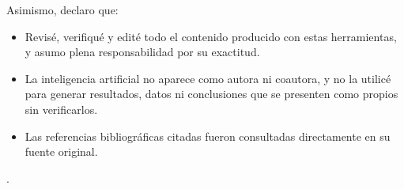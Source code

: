 Asimismo, declaro que:
\begin{itemize}
  \item Revisé, verifiqué y edité todo el contenido producido con estas
        herramientas, y asumo plena responsabilidad por su exactitud.
  \item La inteligencia artificial no aparece como autora ni coautora, y no
        la utilicé para generar resultados, datos ni conclusiones que se
        presenten como propios sin verificarlos.
  \item Las referencias bibliográficas citadas fueron consultadas
        directamente en su fuente original.
\end{itemize}
\else.
\fi

\firmadeclaracion
